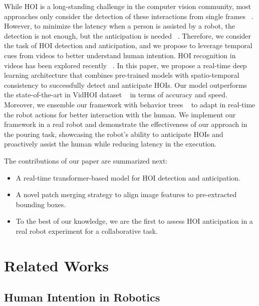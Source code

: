 \documentclass{article}
\begin{document}
While HOI is a long-standing challenge in the computer vision community, most approaches only consider the detection of these interactions from single frames ~\citep{Xu2018, Ulutan2020, JunYI2023, Xiaoqian2022, Liao2022, park2023viplo}. However, to minimize the latency when a person is assisted by a robot, the detection is not enough, but the anticipation is needed ~\citep{hri_delay, hoffman5, GARCIA2020315}. Therefore, we consider the task of HOI detection and anticipation, and we propose to leverage temporal cues from videos to better understand human intention. HOI recognition in videos has been explored recently ~\citep{Chiou2021, Cong2021, Tu2022, NI2023103741}. In this paper, we propose a real-time deep learning architecture that combines pre-trained models with spatio-temporal consistency to successfully detect and anticipate HOIs. Our model outperforms the state-of-the-art in VidHOI dataset ~\citep{Chiou2021} in terms of accuracy and speed. Moreover, we ensemble our framework with behavior trees ~\citep{BehaviorTrees} to adapt in real-time the robot actions for better interaction with the human.  We implement our framework in a real robot and demonstrate the effectiveness of our approach in the pouring task, showcasing the robot's ability to anticipate HOIs and proactively assist the human while reducing latency in the execution.


The contributions of our paper are summarized next: 

\begin{itemize}
    \item A real-time transformer-based model for HOI detection and anticipation.
    \item A novel patch merging strategy to align image features to pre-extracted bounding boxes.
    \item To the best of our knowledge, we are the first to assess HOI anticipation in a real robot experiment for a collaborative task.
\end{itemize}

\section{Related Works} \subsection{Human Intention in Robotics}
\end{document}
